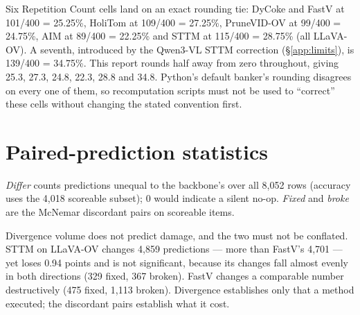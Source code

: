 \documentclass[11pt]{article}
\begin{document}
Six Repetition Count cells land on an exact rounding tie: DyCoke and FastV
at 101/400 = 25.25\%, HoliTom at 109/400 = 27.25\%, PruneVID-OV at 99/400 =
24.75\%, AIM at 89/400 = 22.25\% and STTM at 115/400 = 28.75\% (all
LLaVA-OV). A seventh, introduced by the Qwen3-VL STTM correction
(\S\ref{app:limits}), is 139/400 = 34.75\%. This report rounds half away
from zero throughout, giving 25.3, 27.3, 24.8, 22.3, 28.8 and 34.8. Python's
default banker's rounding disagrees on every one of them, so recomputation
scripts must not be used to ``correct'' these cells without changing the
stated convention first.

\section{Paired-prediction statistics}
\label{app:verification}

\emph{Differ} counts predictions unequal to the backbone's over all 8{,}052
rows (accuracy uses the 4{,}018 scoreable subset); 0 would indicate a silent
no-op. \emph{Fixed} and \emph{broke} are the McNemar discordant pairs on
scoreable items.

Divergence volume does not predict damage, and the two must not be conflated.
STTM on LLaVA-OV changes 4{,}859 predictions --- more than FastV's 4{,}701
--- yet loses 0.94 points and is not significant, because its changes fall
almost evenly in both directions (329 fixed, 367 broken). FastV changes a
comparable number destructively (475 fixed, 1{,}113 broken). Divergence
establishes only that a method executed; the discordant pairs establish what
it cost.
\end{document}
